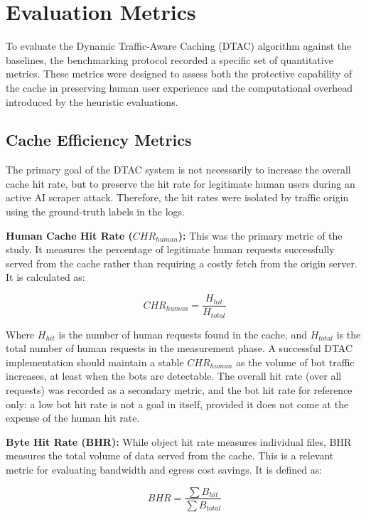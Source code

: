 \section{Evaluation Metrics}
To evaluate the Dynamic Traffic-Aware Caching (DTAC) algorithm against the baselines, the benchmarking protocol recorded a specific set of quantitative metrics. These metrics were designed to assess both the protective capability of the cache in preserving human user experience and the computational overhead introduced by the heuristic evaluations.

\subsection{Cache Efficiency Metrics}
The primary goal of the DTAC system is not necessarily to increase the overall cache hit rate, but to preserve the hit rate for legitimate human users during an active AI scraper attack. Therefore, the hit rates were isolated by traffic origin using the ground-truth labels in the logs.

\textbf{Human Cache Hit Rate ($CHR_{human}$):} This was the primary metric of the study. It measures the percentage of legitimate human requests successfully served from the cache rather than requiring a costly fetch from the origin server. It is calculated as:

\begin{equation}
CHR_{human} = \frac{H_{hit}}{H_{total}}
\end{equation}

Where $H_{hit}$ is the number of human requests found in the cache, and $H_{total}$ is the total number of human requests in the measurement phase. A successful DTAC implementation should maintain a stable $CHR_{human}$ as the volume of bot traffic increases, at least when the bots are detectable. The overall hit rate (over all requests) was recorded as a secondary metric, and the bot hit rate for reference only: a low bot hit rate is not a goal in itself, provided it does not come at the expense of the human hit rate.

\textbf{Byte Hit Rate (BHR):} While object hit rate measures individual files, BHR measures the total volume of data served from the cache. This is a relevant metric for evaluating bandwidth and egress cost savings. It is defined as:

\begin{equation}
BHR = \frac{\sum B_{hit}}{\sum B_{total}}
\end{equation}

